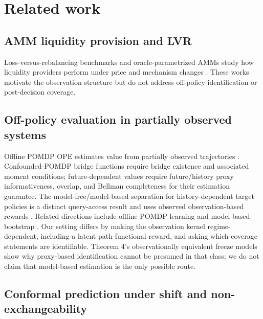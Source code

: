 \section{Related work}

\subsection{AMM liquidity provision and LVR}

Loss-versus-rebalancing benchmarks and oracle-parametrized AMMs study how liquidity providers perform under price and mechanism changes \cite{nezlobin2025,willetts2024,fukasawa2026,amini2026,cha2026}. These works motivate the observation structure but do not address off-policy identification or post-decision coverage.

\subsection{Off-policy evaluation in partially observed systems}

Offline POMDP OPE estimates value from partially observed trajectories \cite{shi2022,uehara2023,zhang2024,zhang2025,kwon2024,luo2026,vanderlaan2025,gan2025}. Confounded-POMDP bridge functions require bridge existence and associated moment conditions; future-dependent values require future/history proxy informativeness, overlap, and Bellman completeness for their estimation guarantee. The model-free/model-based separation for history-dependent target policies is a distinct query-access result and uses observed observation-based rewards \cite{shi2022,uehara2023,zhang2025}. Related directions include offline POMDP learning and model-based bootstrap \cite{zhu2026,su2026}. Our setting differs by making the observation kernel regime-dependent, including a latent path-functional reward, and asking which coverage statements are identifiable. Theorem 4's observationally equivalent freeze models show why proxy-based identification cannot be presumed in that class; we do not claim that model-based estimation is the only possible route.

\subsection{Conformal prediction under shift and non-exchangeability}

